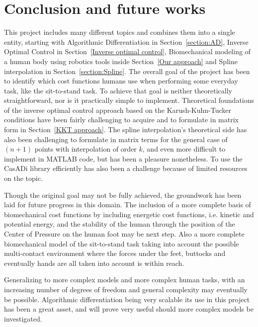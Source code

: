 \documentclass[12pt, a4paper]{article}
\begin{document}
\section{Conclusion and future works}
This project includes many different topics and combines them into a single entity, starting with Algorithmic Differentiation in Section~\ref{section:AD}, Inverse Optimal Control in Section~\ref{Inverse optimal control}, Biomechanical modeling of a human body using robotics tools inside Section~\ref{Our approach} and Spline interpolation in Section~\ref{section:Spline}. The overall goal of the project has been to identify which cost functions humans use when performing some everyday task, like the sit-to-stand task. To achieve that goal is neither theoretically straightforward, nor is it practically simple to implement. Theoretical foundations of the inverse optimal control approach based on the Karush-Kuhn-Tucker conditions have been fairly challenging to acquire and to formulate in matrix form in Section~\ref{KKT approach}. The spline interpolation's theoretical side has also been challenging to formulate in matrix terms for the general case of $(n+1)$ points with interpolation of order $k$, and even more difficult to implement in MATLAB code, but has been a pleasure nonetheless. To use the CasADi library efficiently has also been a challenge because of limited resources on the topic.\par
Though the original goal may not be fully achieved, the groundwork has been laid for future progress in this domain. The inclusion of a more complete basis of biomechanical cost functions by including energetic cost functions, i.e. kinetic and potential energy, and the stability of the human through the position of the Center of Pressure on the human foot may be next step. Also a more complete biomechanical model of the sit-to-stand task taking into account the possible multi-contact environment where the forces under the feet, buttocks and eventually hands are all taken into account is within reach.\par
Generalizing to more complex models and more complex human tasks, with an increasing number of degrees of freedom and general complexity may eventually be possible. Algorithmic differentiation being very scalable its use in this project has been a great asset, and will prove very useful should more complex models be investigated.\par


\listoffigures
\listoftables
\printbibliography[heading=bibintoc, title={Bibliography}]
\end{document}
